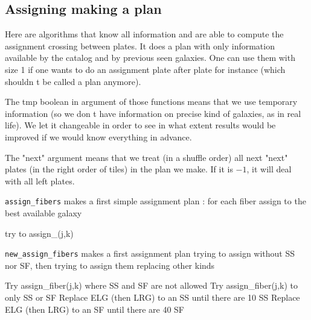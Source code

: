 \documentclass{article}
\begin{document}
\subsection{Assigning making a plan}
Here are algorithms that know all information and are able to compute the assignment crossing between plates. It does a plan with only information available by the catalog and by previous seen galaxies. One can use them with size 1 if one wants to do an assignment plate after plate for instance (which shouldn t be called a plan anymore).

The tmp boolean in argument of those functions means that we use temporary information (so we don t have information on precise kind of galaxies, as in real life). We let it changeable in order to see in what extent results would be improved if we would know everything in advance.

The "next" argument means that we treat (in a shuffle order) all next "next" plates (in the right order of tiles) in the plan we make. If it is $-1$, it will deal with all left plates.

{\tt assign\_fibers} makes a first simple assignment plan : for each fiber assign to the best available galaxy

\begin{algorithm}
	\caption{Assign\_fibers(j0,n)}\label{euclid}
	\begin{algorithmic}[1]
		\State try to assign\_(j,k)
		\EndFor
		\EndFor
	\end{algorithmic}
\end{algorithm}

{\tt new\_assign\_fibers} makes a first assignment plan trying to assign without SS nor SF, then trying to assign them replacing other kinds

\begin{algorithm}
	\caption{New\_assign\_fibers(j0,n)}\label{euclid}
	\begin{algorithmic}[1]
		\State Try assign\_fiber(j,k) where SS and SF are not allowed
		\EndFor
		\State Try assign\_fiber(j,k) to only SS or SF
		\EndFor
		\State Replace ELG (then LRG) to an SS until there are 10 SS
		\EndIf
		\State Replace ELG (then LRG) to an SF until there are 40 SF
		\EndIf
		\EndFor
		\EndFor
	\end{algorithmic}
\end{algorithm}
\end{document}
